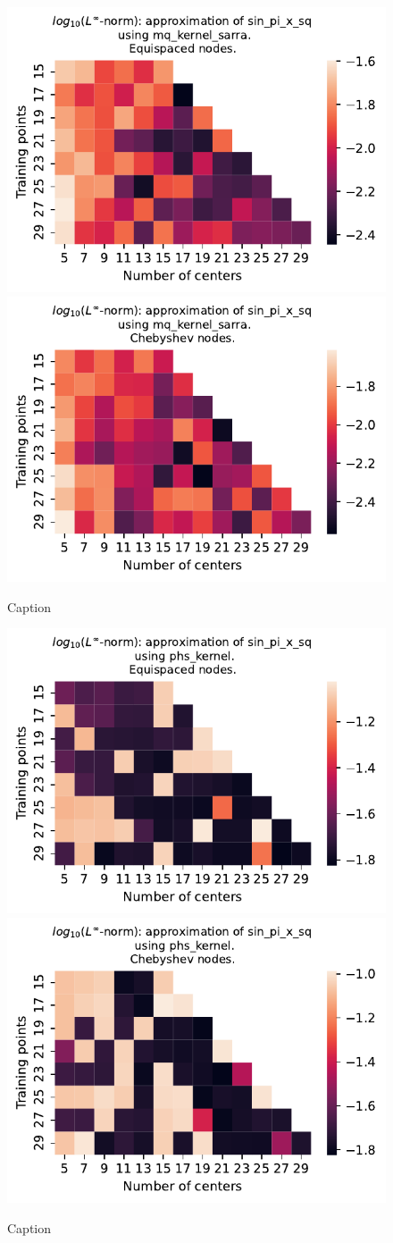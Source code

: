 \documentclass[12pt]{report} %
\begin{document}
\begin{figure}[ht]
  \centering

  \includegraphics[width=.49\textwidth]{imagenes/experiments/1d/variational/sin_pi_x_sq-Kmq_kernel_sarra-Equi.pdf}
  \includegraphics[width=.49\textwidth]{imagenes/experiments/1d/variational/sin_pi_x_sq-Kmq_kernel_sarra-Cheb.pdf}
  \caption{Caption}
  \label{fig:sin-pi-x-sq-sarra}
\end{figure}

\begin{figure}[ht]
  \centering

  \includegraphics[width=.49\textwidth]{imagenes/experiments/1d/variational/sin_pi_x_sq-Kphs_kernel-Equi.pdf}
  \includegraphics[width=.49\textwidth]{imagenes/experiments/1d/variational/sin_pi_x_sq-Kphs_kernel-Cheb.pdf}
  \caption{Caption}
  \label{fig:sin-pi-x-sq-phs}
\end{figure}
\end{document}
